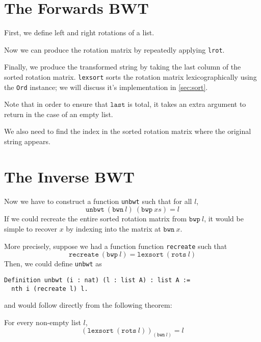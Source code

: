 \documentclass[11pt]{thesis}
\begin{document}
\section{The Forwards BWT}
\label{sec:forwards_BWT}

First, we define left and right rotations of a list.




Now we can produce the rotation matrix by repeatedly applying \texttt{lrot}.



Finally, we produce the transformed string by taking the last column
of the sorted rotation matrix. \texttt{lexsort} sorts the rotation
matrix lexicographically using the \texttt{Ord} instance; we will
discuss it's implementation in \cref{sec:sort}.

Note that in order to ensure that $\mathtt{last}$ is total, it takes
an extra argument to return in the case of an empty list.

We also need to find the index in the sorted rotation matrix where the
original string appears.



\section{The Inverse BWT}
\label{sec:inverse_BWT}

Now we have to construct a function \texttt{unbwt} such that for all $l$,
\begin{equation}
  \mathtt{unbwt}~(\mathtt{bwn}~l)~(\mathtt{bwp}~xs) = l
  \label{eq:unbwt}
\end{equation}
If we could recreate the entire sorted rotation matrix from
$\mathtt{bwp}~l$, it would be simple to recover $x$ by indexing into
the matrix at $\mathtt{bwn}~x$.

More precisely, suppose we had a function function \texttt{recreate}
such that
\begin{equation}
  \mathtt{recreate}~(\mathtt{bwp}~l) = \mathtt{lexsort}~(\mathtt{rots}~l)
  \label{eq:recreate}
\end{equation}
Then, we could define \texttt{unbwt} as
\begin{lstlisting}
Definition unbwt (i : nat) (l : list A) : list A :=
  nth i (recreate l) l.
\end{lstlisting}
and  would follow directly from the following theorem:
\begin{theorem}
  For every non-empty list $l$,
  \begin{equation*}
    (\mathtt{lexsort}~(\mathtt{rots}~l))_{(\mathtt{bwn}~l)} = l
  \end{equation*}
\end{theorem}
\end{document}
